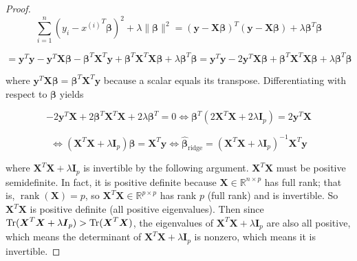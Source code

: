 \begin{proof}

\[
 \sum_{i=1}^{n}\left(y_{i}-{x^{(i)}}^T\boldsymbol{\beta} \right )^{2}+\lambda\lVert \boldsymbol{\beta}\rVert ^{2} = (\boldsymbol{y} - \boldsymbol{X}\boldsymbol{\beta})^T(\boldsymbol{y}-\boldsymbol{X}\boldsymbol{\beta}) + \lambda \boldsymbol{\beta}^T\boldsymbol{\beta}
\]

\[
= \boldsymbol{y}^T\boldsymbol{y} - \boldsymbol{y}^T\boldsymbol{X}\boldsymbol{\beta} - \boldsymbol{\beta}^T\boldsymbol{X}^T\boldsymbol{y}+\boldsymbol{\beta}^T\boldsymbol{X}^T\boldsymbol{X}\boldsymbol{\beta} + \lambda \boldsymbol{\beta}^T\boldsymbol{\beta} = \boldsymbol{y}^T\boldsymbol{y} - 2\boldsymbol{y}^T\boldsymbol{X}\boldsymbol{\beta} +\boldsymbol{\beta}^T\boldsymbol{X}^T\boldsymbol{X}\boldsymbol{\beta} + \lambda \boldsymbol{\beta}^T\boldsymbol{\beta}
\]

where \(\boldsymbol{y}^T\boldsymbol{X}\boldsymbol{\beta} =\boldsymbol{\beta}^T\boldsymbol{X}^T\boldsymbol{y}\) because a scalar equals its transpose. Differentiating with respect to \(\boldsymbol{\beta}\) yields

\[
-2\boldsymbol{y}^T\boldsymbol{X} + 2\boldsymbol{\beta}^T \boldsymbol{X}^T\boldsymbol{X} + 2\lambda \boldsymbol{\beta}^T = 0 \iff \boldsymbol{\beta}^T(2\boldsymbol{X}^T\boldsymbol{X} + 2\lambda \boldsymbol{I}_p) = 2 \boldsymbol{y}^T\boldsymbol{X}
\]

\[
 \iff (\boldsymbol{X}^T\boldsymbol{X} + \lambda \boldsymbol{I}_p) \boldsymbol{\beta}=  \boldsymbol{X}^T\boldsymbol{y} \iff \hat{\boldsymbol{\beta}}_{\text{ridge}} = (\boldsymbol{X}^T\boldsymbol{X} + \lambda \boldsymbol{I}_p)^{-1}\boldsymbol{X}^T\boldsymbol{y}
 \]
 
 where \(\boldsymbol{X}^T\boldsymbol{X} + \lambda \boldsymbol{I}_p\) is invertible by the following argument. \(\boldsymbol{X}^T\boldsymbol{X}\) must be positive semidefinite. In fact, it is positive definite because \( \boldsymbol{X} \in \mathbb{R}^{n \times p}\) has full rank; that is, \(\operatorname{rank}(\boldsymbol{X}) = p\), so \(\boldsymbol{X}^T\boldsymbol{X} \in \mathbb{R}^{p \times p}\) has rank \(p\) (full rank) and is invertible. So \(\boldsymbol{X}^T\boldsymbol{X}\) is positive definite (all positive eigenvalues). Then since \(\Tr(\boldsymbol{X}^T\boldsymbol{X} + \lambda \boldsymbol{I}_p) > \Tr(\boldsymbol{X}^T\boldsymbol{X})\), the eigenvalues of \(\boldsymbol{X}^T\boldsymbol{X} + \lambda \boldsymbol{I}_p\) are also all positive, which means the determinant of \(\boldsymbol{X}^T\boldsymbol{X} + \lambda \boldsymbol{I}_p\) is nonzero, which means it is invertible.

\end{proof}

